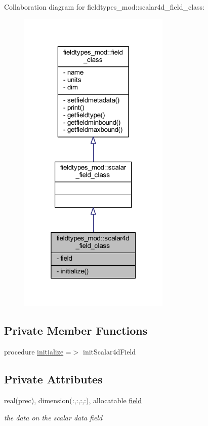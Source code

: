Collaboration diagram for fieldtypes\+\_\+mod\+:\+:scalar4d\+\_\+field\+\_\+class\+:\nopagebreak
\begin{figure}[H]
\begin{center}
\leavevmode
\includegraphics[width=205pt]{structfieldtypes__mod_1_1scalar4d__field__class__coll__graph}
\end{center}
\end{figure}
\subsection*{Private Member Functions}
\begin{DoxyCompactItemize}
\item 
procedure \mbox{\hyperlink{structfieldtypes__mod_1_1scalar4d__field__class_a0ce4946e3ff5282539ae851e451e3b9c}{initialize}} =$>$ init\+Scalar4d\+Field
\end{DoxyCompactItemize}
\subsection*{Private Attributes}
\begin{DoxyCompactItemize}
\item 
real(prec), dimension(\+:,\+:,\+:,\+:), allocatable \mbox{\hyperlink{structfieldtypes__mod_1_1scalar4d__field__class_aa0022774a139bc2d79c23fce42ab167a}{field}}
\begin{DoxyCompactList}\small\item\em the data on the scalar data field \end{DoxyCompactList}\end{DoxyCompactItemize}



